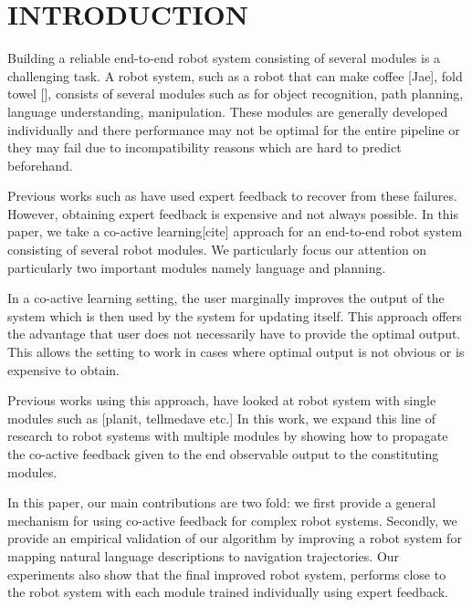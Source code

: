 \section{INTRODUCTION}
Building a reliable end-to-end robot system consisting of several modules is a challenging task.
A robot system, such as a robot that can make coffee [Jae], fold towel [], consists of several
modules such as for object recognition, path planning, language understanding, manipulation. These modules
are generally developed individually and there performance may not be optimal for the entire pipeline or they may fail due to incompatibility reasons which are hard to predict beforehand.

Previous works such as \cite{abbeel2010autonomous} have used expert feedback to recover from these failures. However, obtaining expert feedback is expensive and not always possible. In this paper, we take a co-active learning[cite] approach for an end-to-end robot system consisting of several robot modules. We particularly focus our attention on particularly two important modules namely language and planning.

In a co-active learning setting, the user marginally improves the output of the system which is then used by the system for updating itself. This approach offers the advantage that user does not necessarily have to provide the optimal output. This allows the setting to work in cases where optimal output is not obvious or is expensive to obtain. 

Previous works using this approach, have looked at robot system with single modules such as [planit, tellmedave etc.] 
In this work, we expand this line of research to robot systems with multiple modules by showing how to propagate the co-active feedback given to the end observable output to the constituting modules.


In this paper, our main contributions are two fold: we first provide a general mechanism
for using co-active feedback for complex robot systems. Secondly, we provide an empirical validation of 
our algorithm by improving a robot system for mapping natural language descriptions to navigation  trajectories. Our experiments also show that the final improved robot system, performs close to the robot system with each module trained individually using expert feedback.

